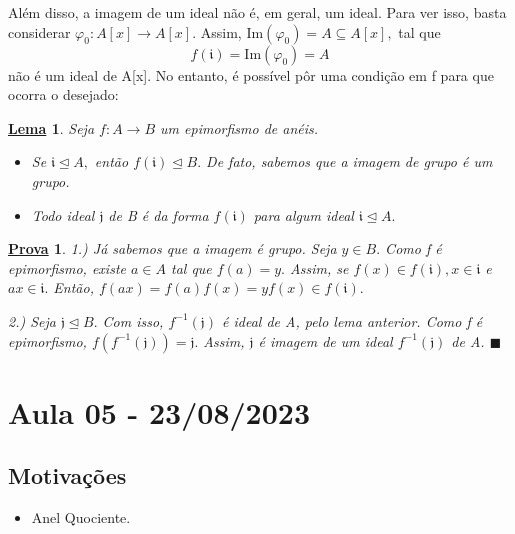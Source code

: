 \documentclass{article}
\newtheorem*{lemma*}{\underline{Lema}}
\newtheorem*{proof*}{\underline{Prova}}
\renewcommand\qedsymbol{$\blacksquare$}
\begin{document}
Além disso, a imagem de um ideal não é, em geral, um ideal. Para ver isso, basta considerar \(\varphi_{0}:A[x]\rightarrow A[x].\)
Assim, \(\mathrm{Im}(\varphi_{0}) = A\subseteq A[x],\) tal que 
\[
  f(\mathfrak{i}) = \mathrm{Im}(\varphi_{0}) = A
\]
não é um ideal de A[x]. No entanto, é possível pôr uma condição em f para que ocorra o desejado:
\begin{lemma*}
  Seja \(f:A\rightarrow B\) um epimorfismo de anéis.
  \begin{itemize}
    \item[1)] Se \(\mathfrak{i}\trianglelefteq{A},\) então \(f(\mathfrak{i})\trianglelefteq{B}.\) De fato, sabemos que a imagem
      de grupo é um grupo.
    \item[2)] Todo ideal \(\mathfrak{j}\) de B é da forma \(f(\mathfrak{i})\) para algum ideal \(\mathfrak{i}\trianglelefteq{A}.\)
  \end{itemize}
\end{lemma*}
\begin{proof*}
  1.) Já sabemos que a imagem é grupo. Seja \(y\in B.\) Como f é epimorfismo, existe
  \(a\in A\) tal que \(f(a) = y.\) Assim, se \(f(x)\in f(\mathfrak{i}), x\in \mathfrak{i}\) e 
  \(ax\in \mathfrak{i}.\) Então, \(f(ax) = f(a)f(x) = y f(x)\in f(\mathfrak{i}).\)

  2.) Seja \(\mathfrak{j}\trianglelefteq{B}.\) Com isso, \(f^{-1}(\mathfrak{j})\) é ideal de A, pelo lema anterior.
  Como f é epimorfismo, \(f(f^{-1}(\mathfrak{j})) = \mathfrak{j}.\) Assim, \(\mathfrak{j}\) é imagem de um ideal
  \(f^{-1}(\mathfrak{j})\) de A. \qedsymbol
\end{proof*}
\newpage

\section{Aula 05 - 23/08/2023}
\subsection{Motivações}
\begin{itemize}
  \item Anel Quociente.
\end{itemize}
\end{document}
